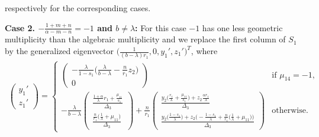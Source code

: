 \documentclass[a4paper,11pt]{article}
\theoremstyle{remark}
\begin{document}
respectively for the corresponding cases.

{\bf Case 2. $-\frac{1+m+n}{\alpha-m-n}= -1$ and $b\ne\lambda$: }
For this case $-1$ has one less geometric multiplicity than the algebraic multiplicity and we replace the first column of $S_1$ by the generalized eigenvector $\big(\frac{1}{(b-\lambda)r_1}, 0, y_1', z_1'\big)^T$, where
\begin{equation} \label{eq:S1-2}
\begin{aligned}
\begin{pmatrix}
 y_1'\\z_1'
\end{pmatrix}
=\begin{cases}
  \begin{pmatrix}
  -\frac{\lambda}{1-s_1}\big(\frac{\lambda}{b-\lambda} -\frac{n}{r_1}z_2\big)\\0
  \end{pmatrix} & \text{if $\mu_{14}=-1$,}\\
  -\frac{\lambda}{b-\lambda}
  \begin{pmatrix}
  \frac{ \frac{1+\alpha}{\lambda}r_1 + \frac{\mu_{11}}{s_1} }{ \Delta_3 }\\
  \frac{ \frac{n}{r_1}\big(\frac{1}{\lambda} + \mu_{11}\big) }{ \Delta_3 }
  \end{pmatrix} +
  \frac{n}{r_1}
  \begin{pmatrix}
  \frac{ y_2\big(\frac{r_1}{\lambda} + \frac{\mu_{11}}{s_1}\big) + z_2\frac{\alpha r_1}{\lambda} }{ \Delta_3 }\\
  \frac{ y_2\big(\frac{1-s_1}{\lambda}\big) + z_2\big(-\frac{1-s_1}{\lambda}+\frac{n}{r_1}\big(\frac{1}{\lambda}+\mu_{11}\big)\big) }{ \Delta_3 }
  \end{pmatrix} & \text{otherwise.}
 \end{cases}
\end{aligned}
\end{equation}
\end{document}
